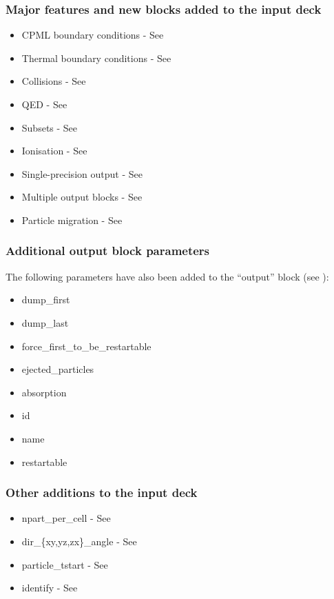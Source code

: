 \subsubsection{Major features and new blocks added to the input deck}

\begin{itemize}
\item CPML boundary conditions - See 
\item Thermal boundary conditions - See 
\item Collisions - See 
\item QED - See 
\item Subsets - See 
\item Ionisation - See 
\item Single-precision output - See 
\item Multiple output blocks - See 
\item Particle migration - See 
\end{itemize}

\subsubsection{Additional output block parameters}

The following parameters have also been added to the ``output'' block
(see ):

\begin{itemize}
\item dump\_first
\item dump\_last
\item force\_first\_to\_be\_restartable
\item ejected\_particles
\item absorption
\item id
\item name
\item restartable
\end{itemize}

\subsubsection{Other additions to the input deck}

\begin{itemize}
\item npart\_per\_cell - See 
\item dir\_\{xy,yz,zx\}\_angle - See 
\item particle\_tstart - See 
\item identify - See 
\end{itemize}

